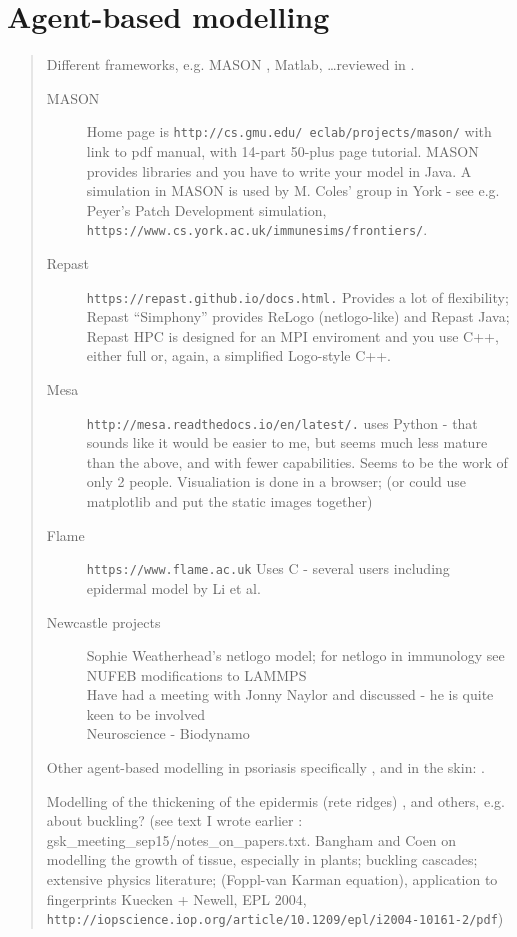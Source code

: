 \documentclass[a4paper,10pt]{report}
\begin{document}
\chapter{Agent-based modelling}

\begin{quote} 
Different  frameworks, e.g. MASON \cite{luke2005mason}, Matlab, \dots reviewed in \cite{macal2009agent}. \\
\begin{description}
\item [MASON] Home page is {\tt http://cs.gmu.edu/~eclab/projects/mason/} with link to pdf manual, with 14-part 50-plus page tutorial. MASON provides libraries and you have to write your model in Java. A simulation in MASON is used by M. Coles' group in York - see e.g. Peyer's Patch Development simulation, \cite{alden2012pairing} {\tt https://www.cs.york.ac.uk/immunesims/frontiers/}. 
\item [Repast] {\tt https://repast.github.io/docs.html.} Provides a lot of flexibility; Repast ``Simphony'' provides ReLogo (netlogo-like) and  Repast Java; Repast HPC is designed for an MPI enviroment and you use C++, either full or, again, a simplified Logo-style C++. 
\item [Mesa] {\tt http://mesa.readthedocs.io/en/latest/.} uses Python - that sounds like it would be easier to me, but seems much less mature than the above, and with fewer capabilities. Seems to be the work of only 2 people. Visualiation is done in a browser; (or could use matplotlib and put the static images together)
\item [Flame] {\tt https://www.flame.ac.uk} Uses C - several users including epidermal model by Li et al. 
\item [Newcastle projects] Sophie Weatherhead's netlogo model; for netlogo in immunology see \cite{chiacchio2014agent}\\
NUFEB modifications to LAMMPS \\
Have had a meeting with Jonny Naylor and discussed - he is quite keen to be involved \\
Neuroscience - Biodynamo \\
\end{description}

Other agent-based modelling  in psoriasis specifically 
\cite{sutterlin2009modeling}, and in the skin: \cite{li2013skin}.

Modelling of the thickening of the epidermis (rete ridges) \cite{iizuka2004psoriatic}, and others, e.g. about buckling? 
(see text I wrote earlier : gsk\_meeting\_sep15/notes\_on\_papers.txt. Bangham and Coen on modelling the growth of tissue, especially in plants; buckling cascades; extensive physics literature; (Foppl-van Karman equation), application to fingerprints  Kuecken + Newell, EPL 2004, {\tt http://iopscience.iop.org/article/10.1209/epl/i2004-10161-2/pdf})



 \end{quote} 
\end{document}
